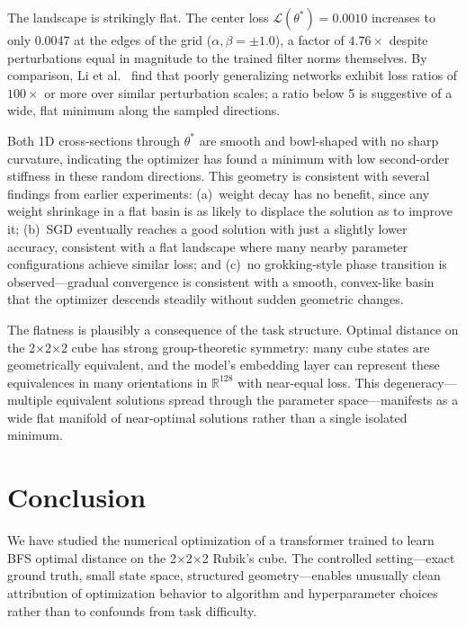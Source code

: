 \documentclass[11pt]{article}
\begin{document}
The landscape is strikingly flat. The center loss $\mathcal{L}(\theta^*) = 0.0010$
increases to only 0.0047 at the edges of the grid ($\alpha, \beta = \pm 1.0$),
a factor of $4.76\times$ despite perturbations equal in magnitude to the trained
filter norms themselves. By comparison, Li et al.~\cite{li2018landscape} find
that poorly generalizing networks exhibit loss ratios of $100\times$ or more
over similar perturbation scales; a ratio below 5 is suggestive of a wide, flat minimum along the sampled
directions.

Both 1D cross-sections through $\theta^*$ are smooth and bowl-shaped with no
sharp curvature, indicating the optimizer has found a minimum with low
second-order stiffness in these random directions. This geometry is consistent
with several findings from earlier experiments: (a)~weight decay has no
benefit, since any weight shrinkage in a flat basin is as likely to displace
the solution as to improve it; (b)~SGD eventually reaches a good solution
with just a slightly lower accuracy, consistent with a flat landscape where
many nearby parameter configurations achieve similar loss; and (c)~no
grokking-style phase transition is observed---gradual convergence is consistent
with a smooth, convex-like basin that the optimizer descends steadily without
sudden geometric changes.

The flatness is plausibly a consequence of the task structure. Optimal distance
on the 2$\times$2$\times$2 cube has strong group-theoretic symmetry: many cube
states are geometrically equivalent, and the model's embedding layer can
represent these equivalences in many orientations in $\mathbb{R}^{128}$ with
near-equal loss. This degeneracy---multiple equivalent solutions spread through
the parameter space---manifests as a wide flat manifold of near-optimal
solutions rather than a single isolated minimum.

\section{Conclusion}
\label{sec:conclusion}

We have studied the numerical optimization of a transformer trained to learn
BFS optimal distance on the 2$\times$2$\times$2 Rubik's cube. The controlled
setting---exact ground truth, small state space, structured geometry---enables
unusually clean attribution of optimization behavior to algorithm and
hyperparameter choices rather than to confounds from task difficulty.
\end{document}
